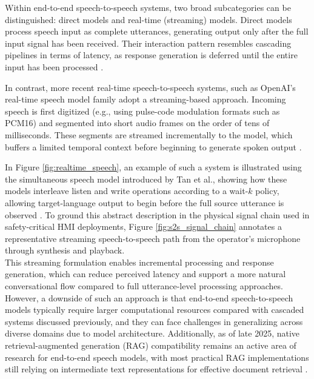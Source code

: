 Within end-to-end speech-to-speech systems, two broad subcategories can be distinguished: direct models and real-time (streaming) models. Direct models process speech input as complete utterances, generating output only after the full input signal has been received. Their interaction pattern resembles cascading pipelines in terms of latency, as response generation is deferred until the entire input has been processed \cite{zhang2024streamspeech}.

In contrast, more recent real-time speech-to-speech systems, such as OpenAI’s real-time speech model family adopt a streaming-based approach. 
Incoming speech is first digitized (e.g., using pulse-code modulation formats such as PCM16) and segmented into short audio frames on the order of tens of milliseconds. 
These segments are streamed incrementally to the model, which buffers a limited temporal context before beginning to generate spoken output \cite{openai_realtime_api}.



In Figure \ref{fig:realtime_speech}, an example of such a system is illustrated using the simultaneous speech model introduced by Tan et al., showing how these models interleave listen and write operations according to a wait-$k$ policy, allowing target-language output to begin before the full source utterance is observed \cite{tan2020simulspeech}. To ground this abstract description in the physical signal chain used in safety-critical HMI deployments, Figure \ref{fig:s2s_signal_chain} annotates a representative streaming speech-to-speech path from the operator's microphone through synthesis and playback.
\\

This streaming formulation enables incremental processing and response generation, which can reduce perceived latency and support a more natural conversational flow compared to full utterance-level processing approaches.
However, a downside of such an approach is that end-to-end speech-to-speech models typically require larger computational resources compared with cascaded systems discussed previously, and they can face challenges in generalizing across diverse domains due to model architecture. 
Additionally, as of late 2025, native retrieval-augmented generation (RAG) compatibility remains an active area of research for end-to-end speech models, with most practical RAG implementations still relying on intermediate text representations for effective document retrieval \cite{min2025speechrag}.


